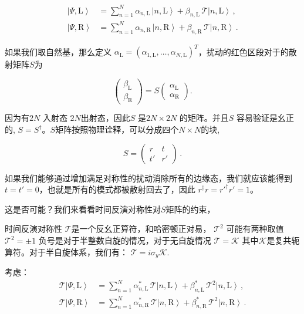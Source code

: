\documentclass[supercite]{HustGraduPaper}
\begin{document}
\begin{equation}
\begin{aligned}
\left|\Psi,\textrm{L}\right\rangle &= \sum_{n=1}^N \alpha_{n,\textrm{L}}\,\left|n,\textrm{L}\right\rangle + \beta_{n,\textrm{L}}\,\mathcal{T}\left|n,\textrm{L}\right\rangle\,,\\
\left|\Psi,\textrm{R}\right\rangle &= \sum_{n=1}^N \alpha_{n,\textrm{R}}\,\left|n,\textrm{R}\right\rangle + \beta_{n,\textrm{R}}\,\mathcal{T}\left|n,\textrm{R}\right\rangle\,.
\end{aligned}
\end{equation}


如果我们取自然基，那么定义 $\alpha_\textrm{L} = (\alpha_{1,\textrm{L}},\dots,\alpha_{N,\textrm{L}})^T$，扰动的红色区段对于的散射矩阵$S$为 

\begin{equation}
\begin{pmatrix} \beta_\textrm{L} \\ \beta_\textrm{R} \end{pmatrix} = S \begin{pmatrix} \alpha_\textrm{L} \\ \alpha_\textrm{R} \end{pmatrix}.
\end{equation}

因为有$2N$ 入射态 $2N$出射态，因此$S$ 是$2N\times 2N$ 的矩阵。并且$S$ 容易验证是幺正的, $S=S^\dagger$。$S$矩阵按照物理诠释，可以分成四个$N\times N$的块,

$$ S = \begin{pmatrix} r & t\\ t' & r' \end{pmatrix}\,. $$

如果我们能够通过增加满足对称性的扰动消除所有的边缘态，我们就应该能得到 $t = t' = 0$，也就是所有的模式都被散射回去了，因此 $r^\dagger r = r'^\dagger r' = 1$。

这是否可能？我们来看看时间反演对称性对$S$矩阵的约束，

时间反演对称性 $\mathcal{T}$是一个反幺正算符，和哈密顿正对易， $\mathcal{T}^2$ 可能有两种取值 $\mathcal{T}^2=\pm1$ 负号是对于半整数自旋的情况，对于无自旋情况 $\mathcal{T}=\mathcal{K}$ 其中$\mathcal{K}$是复共轭算符。对于半自旋体系，我们有： $\mathcal{T}=i\sigma_y\mathcal{K}$.

考虑：
\begin{equation}
\begin{aligned}
\mathcal{T}\left|\Psi,\textrm{L}\right\rangle &= \sum_{n=1}^N \alpha^*_{n,\textrm{L}}\,\mathcal{T}\left|n,\textrm{L}\right\rangle + \beta^*_{n,\textrm{L}}\,\mathcal{T}^2\left|n,\textrm{L}\right\rangle\,,\\
\mathcal{T}\left|\Psi,\textrm{R}\right\rangle &= \sum_{n=1}^N \alpha^*_{n,\textrm{R}}\,\mathcal{T}\left|n,\textrm{R}\right\rangle + \beta^*_{n,\textrm{R}}\,\mathcal{T}^2\left|n,\textrm{R}\right\rangle\,. 
\end{aligned}
\end{equation}
\end{document}
